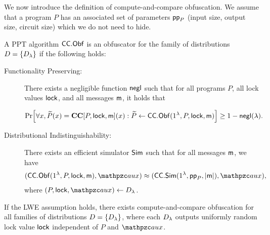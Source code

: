 We now introduce the definition of compute-and-compare obfuscation.
We assume that a program $P$ has an associated set of parameters $\mathsf{pp}_P$ (input size, output size, circuit size) which we do not need to hide.
\begin{definition}\label{def:CCObf}
A PPT algorithm $\mathsf{CC}.\mathsf{Obf}$ is an obfuscator for the family of distributions $D=\{D_\lambda\}$ if the following holds:
\begin{description}
\item[Functionality Preserving:] There exists a negligible function
${\mathsf{negl}}$ such that for all programs $P$, all lock values $\mathsf{lock}$, and
all messages $\mathsf{m}$, it holds that

\begin{align}
\Pr[\forall x, \widetilde{P}(x)=\mathbf{CC}[P,\mathsf{lock},\mathsf{m}](x) :
\widetilde{P}\leftarrow\mathsf{CC}.\mathsf{Obf}(1^\lambda,P,\mathsf{lock},\mathsf{m})] \ge 1-{\mathsf{negl}}(\lambda).
\end{align}
\item[Distributional Indistinguishability:] There exists an
efficient simulator $\mathsf{Sim}$ such that for all messages $\mathsf{m}$, we have
\begin{align}
(\CCObf(1^\secp,P,\lock,\msg),\qaux)\approx(\CCSim(1^\secp,\pp_P,\abs{\msg}),\qaux),
\end{align}
where $(P,\lock,\qaux)\la D_\secp$.
\end{description}
\end{definition}

\begin{theorem}
If the LWE assumption holds, there exists compute-and-compare obfuscation for all families of distributions $D=\{D_\lambda\}$, where each $D_\lambda$ outputs uniformly random lock value $\mathsf{lock}$ independent of $P$ and $\qaux$.
\end{theorem}
\fi
 
